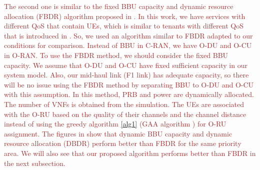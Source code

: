 \documentclass[lettersize,journal]{IEEEtran}
\begin{document}
\textcolor{brown}{The second one is similar to the fixed BBU capacity and dynamic resource allocation (FBDR) algorithm proposed in \cite{lee2018dynamic}. In this work, we have services with different QoS that contain UEs, which is similar to tenants with different QoS that is introduced in \cite{lee2018dynamic}.
 So, we used an algorithm similar to FBDR adapted to our conditions for comparison.  
Instead of BBU in C-RAN, we have O-DU and O-CU in O-RAN. To use the FBDR method, we should consider the fixed BBU capacity. We assume that O-DU and O-CU have fixed sufficient capacity in our system model. Also, our mid-haul link (F1 link) has adequate capacity, so there will be no issue using the FBDR method by separating ‌BBU to O-DU and O-CU with this assumption.
In this method, PRB and power are dynamically allocated. The number of VNFs is obtained from the simulation. The UEs are associated with the O-RU based on the quality of their channels and the channel distance instead of using the greedy algorithm \ref{alg1} (GAA algorithm ) for O-RU assignment.
The figures in \cite{lee2018dynamic} show that dynamic BBU capacity and dynamic resource allocation (DBDR) perform better than FBDR for the same priority area. We will also see that our proposed algorithm performs better than FBDR in the next subsection.
}
\vspace*{-1em}
\end{document}

